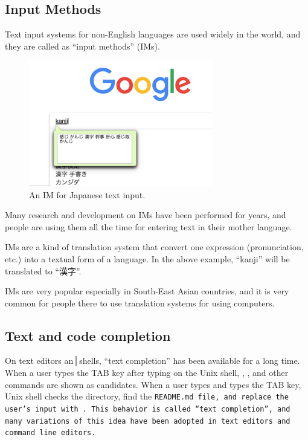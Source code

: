 \documentclass{sigchi}
\begin{document}
\subsection{Input Methods}

Text input systems for non-English languages are used widely in the world, and
they are called as ``input methods'' (IMs).

\begin{figure}[h]
  \includegraphics[width=8cm,bb=0 0 976 670]{figures/nyuuryoku-ime.png}
  \caption{An IM for Japanese text input.}
  \label{bash1}
\end{figure}

Many research and development on IMs have been performed for years, and
people are using them all the time for entering text in their mother language.

IMs are a kind of translation system that convert one
expression (pronunciation, etc.) into a textual form of a language.
In the above example, ``kanji'' will be translated to ``漢字''.

IMs are very popular especially in South-East Asian countries, and
it is very common for people there to 
use translation systems for using computers.

\subsection{Text and code completion}

On text editors an│shells,
``text completion'' has been available for a long time.
%
When a user types the TAB key after typing  on the Unix shell,
, , and other commands are shown as candidates.
When a user types  and types the TAB key,
Unix shell checks the directory, find the \tt{README.md} file, and
replace the user's input with .
This behavior is called ``text completion'', and many variations of
this idea have been adopted in text editors and command line editors.
\end{document}
